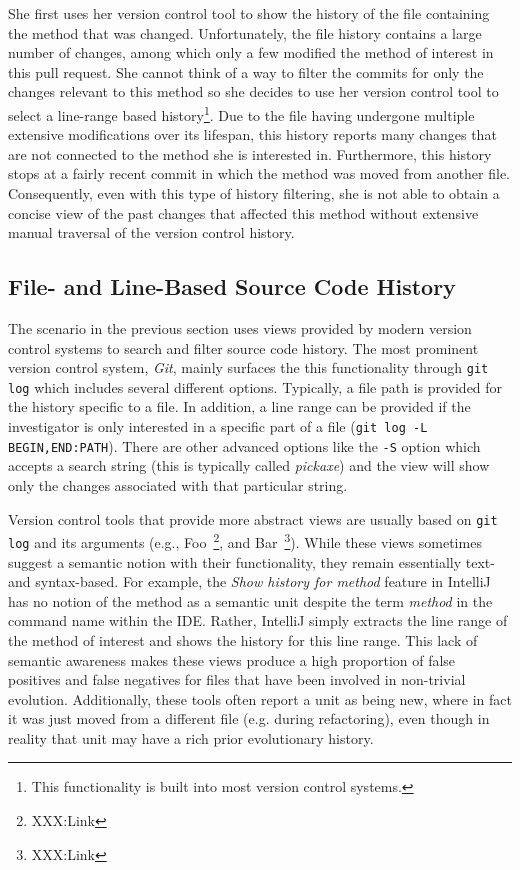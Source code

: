 She first uses her version control tool to show the history of the file containing the method that was changed.
Unfortunately, the file history contains a large number of changes, among which only a few modified the method of interest in this pull request. 
She cannot think of a way to filter the commits for only the changes relevant to this method so she decides to use her version control tool  to select a line-range based history\footnote{This functionality is built into most version control systems.}.
Due to the file having undergone multiple extensive modifications over its lifespan, this history reports many changes that are not connected to the method she is interested in.
Furthermore, this history stops at a fairly recent commit in which the method was moved from another file.
Consequently, even with this type of history filtering, she is not able to obtain a concise view of the past changes that affected this method without extensive manual traversal of the version control history.

\subsection{File- and Line-Based Source Code History}
\label{sec:background}

The scenario in the previous section uses views provided by modern version control systems to search and filter source code history. The most prominent version control system, \textit{Git}, mainly surfaces the this functionality through \texttt{git log} which includes several different options. Typically, a file path is provided for the history specific to a file. In addition, a line range can be provided if the investigator is only interested in a specific part of a file (\texttt{git log -L BEGIN,END:PATH}). There are other advanced options like the \texttt{-S} option which accepts a search string (this is typically called \textit{pickaxe}) and the view will show only the changes associated with that particular string.

Version control tools that provide more abstract views are usually based on \texttt{git log} and its arguments (e.g., Foo~\footnote{XXX:Link}, and Bar~\footnote{XXX:Link}).
While these views sometimes suggest a semantic notion with their functionality, they remain essentially text- and syntax-based. 
For example, the \textit{Show history for method} feature in IntelliJ has no notion of the method as a semantic unit despite the term \textit{method} in the command name within the IDE.
Rather, IntelliJ simply extracts the line range of the method of interest and shows the history for this line range. 
This lack of semantic awareness makes these views produce a high proportion of false positives and false negatives for files that have been involved in non-trivial evolution. Additionally, these tools often report a unit as being new, where in fact it was just moved from a different file (e.g. during refactoring), even though in reality that unit may have a rich prior evolutionary history.

